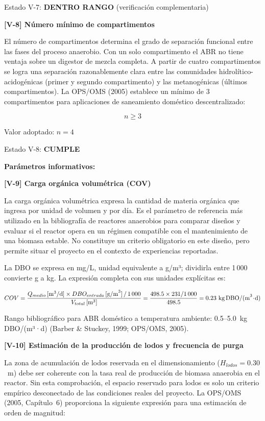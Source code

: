 \documentclass[12pt,a4paper]{article}
\begin{document}
Estado V-7: \textbf{DENTRO RANGO} (verificación complementaria)

\textbf{[V-8] Número mínimo de compartimentos}

El número de compartimentos determina el grado de separación funcional entre las fases del proceso anaerobio. Con un solo compartimento el ABR no tiene ventaja sobre un digestor de mezcla completa. A partir de cuatro compartimentos se logra una separación razonablemente clara entre las comunidades hidrolítico-acidogénicas (primer y segundo compartimento) y las metanogénicas (últimos compartimentos). La OPS/OMS (2005) establece un mínimo de 3 compartimentos para aplicaciones de saneamiento doméstico descentralizado:

\begin{equation}
n \geq 3
\end{equation}

Valor adoptado: $n = 4$

Estado V-8: \textbf{CUMPLE}

\textbf{Parámetros informativos:}

\textbf{[V-9] Carga orgánica volumétrica (COV)}

La carga orgánica volumétrica expresa la cantidad de materia orgánica que ingresa por unidad de volumen y por día. Es el parámetro de referencia más utilizado en la bibliografía de reactores anaerobios para comparar diseños y evaluar si el reactor opera en un régimen compatible con el mantenimiento de una biomasa estable. No constituye un criterio obligatorio en este diseño, pero permite situar el proyecto en el contexto de experiencias reportadas.

La DBO se expresa en mg/L, unidad equivalente a g/m³; dividirla entre 1\,000 convierte g a kg. La expresión completa con sus unidades explícitas es:

\begin{equation}
COV = \frac{Q_{medio} \,[\text{m}^3/\text{d}] \times DBO_{entrada} \,[\text{g/m}^3] \,/\, 1\,000}{V_{total} \,[\text{m}^3]} = \frac{498.5 \times 231 / 1\,000}{498.5} = 0.23 \text{ kg\,DBO/(m}^3\!\cdot\!\text{d)}
\end{equation}

Rango bibliográfico para ABR doméstico a temperatura ambiente: 0.5--5.0~kg\,DBO/(m³·d) (Barber \& Stuckey, 1999; OPS/OMS, 2005).

\textbf{[V-10] Estimación de la producción de lodos y frecuencia de purga}

La zona de acumulación de lodos reservada en el dimensionamiento ($H_{lodos} = 0.30$~m) debe ser coherente con la tasa real de producción de biomasa anaerobia en el reactor. Sin esta comprobación, el espacio reservado para lodos es solo un criterio empírico desconectado de las condiciones reales del proyecto. La OPS/OMS (2005, Capítulo~6) proporciona la siguiente expresión para una estimación de orden de magnitud:
\end{document}
